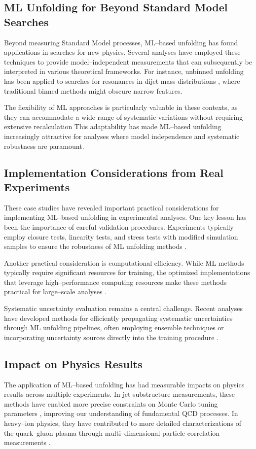 \subsection{ML Unfolding for Beyond Standard Model Searches}
    Beyond measuring Standard Model processes, ML--based unfolding has found applications in searches for new physics.
    Several analyses have employed these techniques to provide model--independent measurements that can subsequently be interpreted in various theoretical frameworks.
    For instance, unbinned unfolding has been applied to searches for resonances in dijet mass distributions , where traditional binned methods might obscure narrow features.

    The flexibility of ML approaches is particularly valuable in these contexts, as they can accommodate a wide range of systematic variations without requiring extensive recalculation
    This adaptability has made ML--based unfolding increasingly attractive for analyses where model independence and systematic robustness are paramount.
    
\subsection{Implementation Considerations from Real Experiments}
    These case studies have revealed important practical considerations for implementing ML--based unfolding in experimental analyses.
    One key lesson has been the importance of careful validation procedures.
    Experiments typically employ closure tests, linearity tests, and stress tests with modified simulation samples to ensure the robustness of ML unfolding methods .

    Another practical consideration is computational efficiency.
    While ML methods typically require significant resources for training, the optimized implementations that leverage high--performance computing resources make these methods practical for large--scale analyses .

    Systematic uncertainty evaluation remains a central challenge. Recent analyses have developed methods for efficiently propagating systematic uncertainties through ML unfolding pipelines, often employing ensemble techniques or incorporating uncertainty sources directly into the training procedure .

\subsection{Impact on Physics Results}
    The application of ML--based unfolding has had measurable impacts on physics results across multiple experiments.
    In jet substructure measurements, these methods have enabled more precise constraints on Monte Carlo tuning parameters , improving our understanding of fundamental QCD processes.
    In heavy--ion physics, they have contributed to more detailed characterizations of the quark--gluon plasma through multi--dimensional particle correlation measurements .


